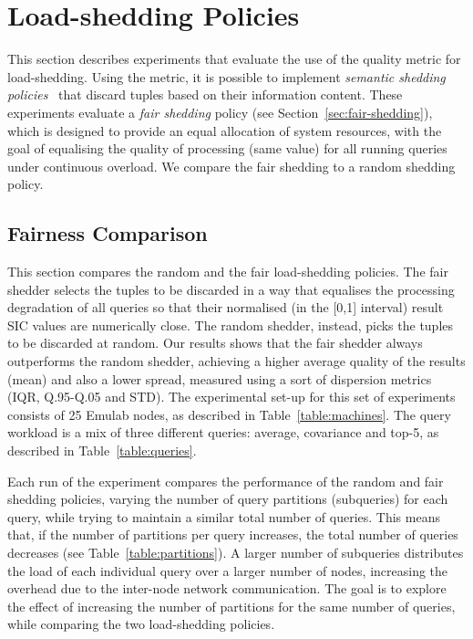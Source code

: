 \section{\mbox{Load-shedding} Policies}
\label{sec:ls-eval}

This section describes experiments that evaluate the use of the \sic quality metric for
\mbox{load-shedding}. Using the \sic metric, it is possible to implement \emph{semantic shedding
policies}~\cite{sem-ls} that discard tuples based on their information content.
These experiments evaluate a \emph{fair shedding} policy (see Section~\ref{sec:fair-shedding}), which is
designed to provide an equal allocation of system resources, with the goal of equalising the
quality of processing (\ie same \sic value) for all running queries under continuous overload.
We compare the fair shedding to a random shedding policy.

\subsection*{Fairness Comparison}
This section compares the random and the fair load-shedding policies. 
The fair shedder selects the tuples to be discarded in a way that equalises the processing
degradation of all queries so that their normalised (\ie in the [0,1] interval) result SIC values are numerically
close.
The random shedder, instead, picks the tuples to be discarded at random.
Our results shows that the fair shedder always outperforms the random shedder,
achieving a higher average quality of the results (mean) and also a lower spread, measured
using a sort of dispersion metrics (IQR, Q.95-Q.05 and STD).
The experimental set-up for this set of experiments consists of 25 Emulab nodes, as described in
Table~\ref{table:machines}.
The query workload is a mix of three different queries: average, covariance and top-5, as described in
Table~\ref{table:queries}. 

Each run of the experiment compares the performance of the random and fair shedding policies, varying the
number of query partitions (\ie subqueries) for each query, while trying to maintain a similar total
number of queries. 
This means that, if the number of partitions per query increases, the total number of queries
decreases (see Table~\ref{table:partitions}). 
A larger number of subqueries distributes the load of each individual query over
a larger number of nodes, increasing the overhead due to the inter-node network communication.
The goal is to explore the effect of increasing the number of partitions for the same number of queries,
while comparing the two load-shedding policies.


